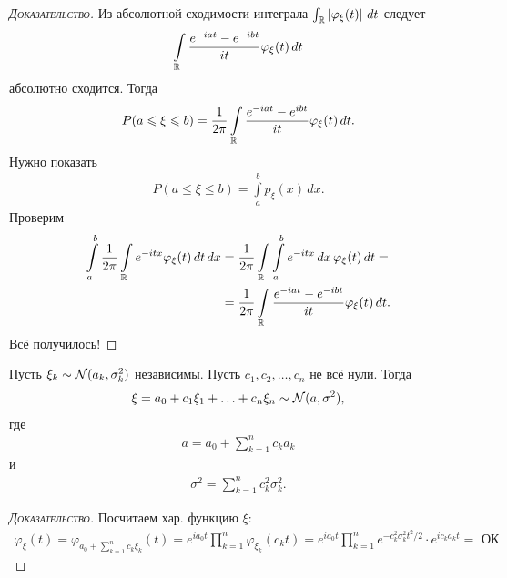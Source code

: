 \documentclass[../main.tex]{subfiles}
\begin{document}
\begin{proof}[\normalfont\textsc{Доказательство}]
 Из абсолютной сходимости интеграла $ \int_{\mathbb{R}} \left| \varphi_\xi(t) \right|\,dt  $ следует 
 \begin{align*}
  \int\limits_{\mathbb{R}} \frac{e^{-iat}-e^{-ibt}}{it} \varphi_\xi(t)\,dt
 \end{align*} абсолютно сходится. Тогда
 \begin{align*}
  P(a \leqslant \xi \leqslant b) = \frac{1}{2\pi} \int\limits_{\mathbb{R}} \frac{e^{-iat}-e^{ibt}}{it}\varphi_\xi(t)\,dt. 
 \end{align*} Нужно показать
 \begin{align*}
  P(a \leqslant \xi \leqslant b) = \int\limits_{a}^{b} p_\xi(x)\,dx.
 \end{align*} Проверим
 \begin{align*}
  \int\limits_{a}^{b} \frac{1}{2\pi} \int\limits_{\mathbb{R}} e^{-itx}\varphi_\xi(t)\,dt\,dx &= \frac{1}{2\pi}\int\limits_{\mathbb{R}}  \int\limits_{a}^{b} e^{-itx}\,dx\,\varphi_\xi(t)\,dt = \\
  &= \frac{1}{2\pi} \int\limits_{\mathbb{R}} \frac{e^{-iat}-e^{-ibt}}{it} \varphi_\xi(t)\,dt.
 \end{align*} Всё получилось!
\end{proof}

\begin{thm}
 Пусть $ \xi_k \sim \mathcal N(a_k, \sigma_k^{2}) $ независимы. Пусть $ c_1, c_2, \ldots, c_n $ не всё нули. Тогда
 \begin{align*}
  \xi = a_0 + c_1 \xi_1 + \ldots + c_n \xi_n \sim \mathcal N(a, \sigma^{2}),
 \end{align*} где
 \begin{align*}
  a = a_0 + \sum_{k=1}^{n}c_ka_k
 \end{align*} и
 \begin{align*}
  \sigma^{2} = \sum_{k=1}^{n}c_k^{2}\sigma_k^{2}.
 \end{align*}
\end{thm}
\begin{proof}[\normalfont\textsc{Доказательство}]
 Посчитаем хар. функцию $ \xi $:
 \begin{align*}
  \varphi_\xi(t) = \varphi_{a_0 + \sum_{k=1}^{n}c_k\xi_k}(t) = e^{ia_0 t} \prod_{k=1}^{n}\varphi_{\xi_k}(c_k t) = e^{ia_0t}\prod_{k=1}^{n} e^{-c_k^{2}\sigma_k^{2} t^{2} / 2} \cdot e^{ic_ka_k t} = \text{ ОК }
 \end{align*}
\end{proof}
\end{document}
